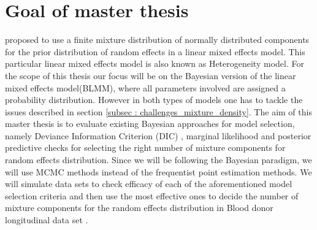 \section{Goal of master thesis}
\label{sec : goal}
\citet*{verbeke_linear_1996} proposed to use a finite mixture distribution of normally distributed components for the prior distribution of random effects in a linear mixed effects model. This particular linear mixed effects model is also known as Heterogeneity model. For the scope of this thesis our focus will be on the Bayesian version of the linear mixed effects model(BLMM), where all parameters involved are assigned a probability distribution. However in both types of models one has to tackle the issues described in section \ref{subsec : challenges_mixture_density}. The aim of this master thesis is to evaluate existing Bayesian approaches for model selection, namely Deviance Information Criterion (DIC) , marginal likelihood and posterior predictive checks for selecting the right number of mixture components for random effects distribution. Since we will be following the Bayesian paradigm, we will use MCMC methods instead of the frequentist point estimation methods. We will simulate data sets to check efficacy of each of the aforementioned model selection criteria and then use the most effective ones to decide the number of mixture components for the random effects distribution in Blood donor longitudinal data set \citep{nasserinejad_prevalence_2015}.